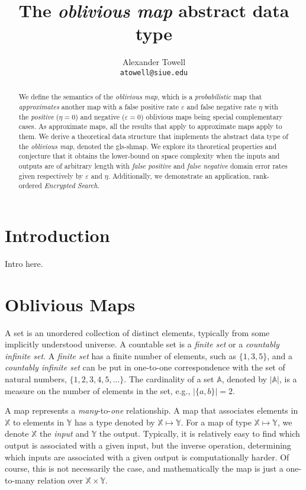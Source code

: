 \documentclass{article}
\title
{
    The \emph{oblivious map} abstract data type
}
\author
{
    Alexander Towell\\
    \texttt{atowell@siue.edu}
}
\date{}
\begin{document}
\maketitle
\begin{abstract}
We define the semantics of the \emph{oblivious map}, which is a \emph{probabilistic} map that \emph{approximates} another map with a false positive rate $\varepsilon$ and false negative rate $\eta$ with the \emph{positive} ($\eta = 0$) and negative ($\varepsilon = 0$) oblivious maps being special complementary cases. As approximate maps, all the results that apply to approximate maps apply to them. We derive a theoretical data structure that implements the abstract data type of the \emph{oblivious map}, denoted the \gls{gls-shmap}. We explore its theoretical properties and conjecture that it obtains the lower-bound on space complexity when the inputs and outputs are of arbitrary length with \emph{false positive} and \emph{false negative} domain error rates given respectively by $\varepsilon$ and $\eta$. Additionally, we demonstrate an application, rank-ordered \emph{Encrypted Search}.
\end{abstract}

\tableofcontents
\listoffigures
\listofalgorithms

\section{Introduction}
\label{sec:intro}

Intro here.


\section{Oblivious Maps}
\label{sec:map}
A set is an unordered collection of distinct elements, typically from some implicitly understood universe.
A countable set is a \emph{finite set} or a \emph{countably infinite set}. A \emph{finite set} has a finite number of elements, such as $\{ 1, 3, 5 \}$, and 
a \emph{countably infinite set} can be put in one-to-one correspondence with the set of natural numbers, $\{1,2,3,4,5,\ldots\}$.
The cardinality of a set $\mathbb{A}$, denoted by $|\mathbb{A}|$, is a measure on the number of elements in the set, e.g., $|\{a,b\}|=2$.

A map represents a \emph{many}-to-\emph{one} relationship. A map that associates elements in $\mathbb{X}$ to elements in $\mathbb{Y}$ has a type denoted by $\mathbb{X}\mapsto\mathbb{Y}$.
For a map of type $\mathbb{X} \mapsto \mathbb{Y}$, we denote $\mathbb{X}$ the \emph{input} and $\mathbb{Y}$ the output.
Typically, it is relatively easy to find which output is associated with a given input, but the inverse operation, determining which inputs are associated with a given output is computationally harder.
Of course, this is not necessarily the case, and mathematically the map is just a one-to-many relation over $\mathbb{X} \times \mathbb{Y}$.
\end{document}
